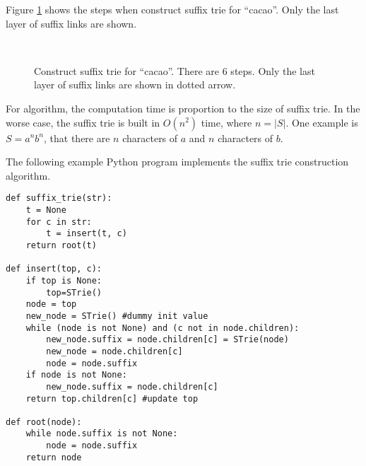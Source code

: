 \documentclass{article}
\begin{document}
Figure \ref{fig:cons-strie-cacao} shows the steps
when construct suffix trie for ``cacao''.
Only the last layer of suffix links are shown.

\begin{figure}[htbp]
  \centering
   \\
  \caption{Construct suffix trie for ``cacao''. There are 6 steps. Only the last layer of suffix links are shown in dotted arrow.}
  \label{fig:cons-strie-cacao}
\end{figure}

For  algorithm, the computation time
is proportion to the size of suffix trie. In the worse case, the suffix trie is
built in $O(n^2)$ time, where $n = |S|$. One example is $S=a^nb^n$, that there are $n$
characters of $a$ and $n$ characters of $b$.

The following example Python program implements the suffix trie construction algorithm.

\lstset{language=Python}
\begin{lstlisting}
def suffix_trie(str):
    t = None
    for c in str:
        t = insert(t, c)
    return root(t)

def insert(top, c):
    if top is None:
        top=STrie()
    node = top
    new_node = STrie() #dummy init value
    while (node is not None) and (c not in node.children):
        new_node.suffix = node.children[c] = STrie(node)
        new_node = node.children[c]
        node = node.suffix
    if node is not None:
        new_node.suffix = node.children[c]
    return top.children[c] #update top

def root(node):
    while node.suffix is not None:
        node = node.suffix
    return node
\end{lstlisting}
\end{document}

